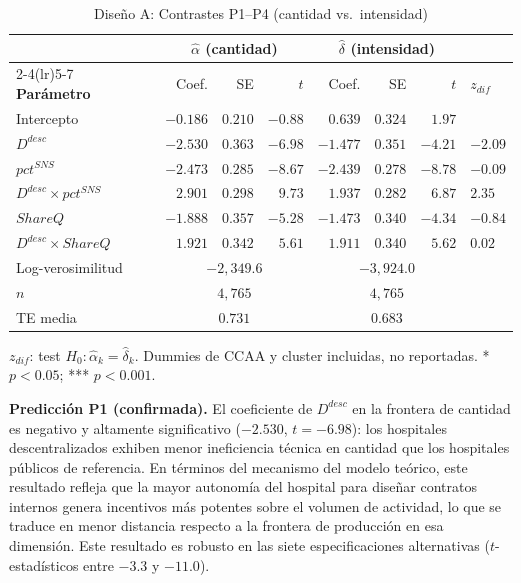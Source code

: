 \begin{table}[htbp]
\centering
\caption{Diseño A: Contrastes P1--P4 (cantidad vs.\ intensidad)}
\label{tab:disA}
\begin{threeparttable}
\begin{tabular}{lrrrrrrl}
\toprule
& \multicolumn{3}{c}{\textbf{$\hat{\alpha}$ (cantidad)}}
& \multicolumn{3}{c}{\textbf{$\hat{\delta}$ (intensidad)}} & \\
\cmidrule(lr){2-4}\cmidrule(lr){5-7}
\textbf{Parámetro} & Coef. & SE & $t$
  & Coef. & SE & $t$ & \textbf{$z_{dif}$} \\
\midrule
Intercepto
  & $-0.186$ & $0.210$ & $-0.88$
  & $0.639$  & $0.324$ & $1.97$ & \\
$D^{desc}$
  & $-2.530$ & $0.363$ & $-6.98$\sig{***}
  & $-1.477$ & $0.351$ & $-4.21$\sig{***}
  & $-2.09$\sig{*} \\
$pct^{SNS}$
  & $-2.473$ & $0.285$ & $-8.67$\sig{***}
  & $-2.439$ & $0.278$ & $-8.78$\sig{***}
  & $-0.09$ \\
$D^{desc} \times pct^{SNS}$
  & $2.901$  & $0.298$ & $9.73$\sig{***}
  & $1.937$  & $0.282$ & $6.87$\sig{***}
  & $2.35$\sig{*} \\
$ShareQ$
  & $-1.888$ & $0.357$ & $-5.28$\sig{***}
  & $-1.473$ & $0.340$ & $-4.34$\sig{***}
  & $-0.84$ \\
$D^{desc} \times ShareQ$
  & $1.921$  & $0.342$ & $5.61$\sig{***}
  & $1.911$  & $0.340$ & $5.62$\sig{***}
  & $0.02$ \\
\midrule
Log-verosimilitud & \multicolumn{3}{c}{$-2{,}349.6$}
  & \multicolumn{3}{c}{$-3{,}924.0$} & \\
$n$ & \multicolumn{3}{c}{$4{,}765$}
  & \multicolumn{3}{c}{$4{,}765$} & \\
TE media & \multicolumn{3}{c}{$0.731$}
  & \multicolumn{3}{c}{$0.683$} & \\
\bottomrule
\end{tabular}
\begin{tablenotes}
  \small
  \item $z_{dif}$: test $H_0: \hat{\alpha}_k = \hat{\delta}_k$. Dummies de CCAA y cluster incluidas, no reportadas. * $p<0.05$; *** $p<0.001$.
\end{tablenotes}
\end{threeparttable}
\end{table}

\textbf{Predicción P1 (confirmada).} El coeficiente de $D^{desc}$ en la frontera de cantidad es negativo y altamente significativo ($-2.530$, $t=-6.98$): los hospitales descentralizados exhiben menor ineficiencia técnica en cantidad que los hospitales públicos de referencia. En términos del mecanismo del modelo teórico, este resultado refleja que la mayor autonomía del hospital para diseñar contratos internos genera incentivos más potentes sobre el volumen de actividad, lo que se traduce en menor distancia respecto a la frontera de producción en esa dimensión. Este resultado es robusto en las siete especificaciones alternativas ($t$-estadísticos entre $-3.3$ y $-11.0$).

